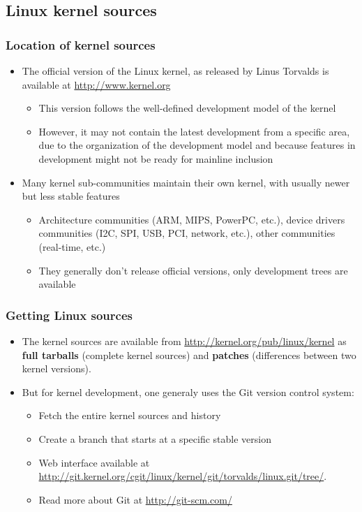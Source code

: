 \subsection{Linux kernel sources}

\begin{frame}
  \frametitle{Location of kernel sources}
  \begin{itemize}
  \item The official version of the Linux kernel, as released by Linus
    Torvalds is available at \url{http://www.kernel.org}
    \begin{itemize}
    \item This version follows the well-defined development model of
      the kernel
    \item However, it may not contain the latest development from a
      specific area, due to the organization of the development model
      and because features in development might not be ready for
      mainline inclusion
    \end{itemize}
  \item Many kernel sub-communities maintain their own kernel, with
    usually newer but less stable features
    \begin{itemize}
    \item Architecture communities (ARM, MIPS, PowerPC, etc.), device
      drivers communities (I2C, SPI, USB, PCI, network, etc.), other
      communities (real-time, etc.)
    \item They generally don't release official versions, only
      development trees are available
    \end{itemize}
  \end{itemize}
\end{frame}

\begin{frame}
  \frametitle{Getting Linux sources}
  \begin{itemize}

  \item The kernel sources are available from
    \url{http://kernel.org/pub/linux/kernel} as {\bf full tarballs}
    (complete kernel sources) and {\bf patches} (differences between
    two kernel versions).
  \item But for kernel development, one generaly uses the Git version
    control system:
    \begin{itemize}
    \item Fetch the entire kernel sources and history\\
    \item Create a branch that starts at a specific stable version\\
    \item Web interface available at
      \url{http://git.kernel.org/cgit/linux/kernel/git/torvalds/linux.git/tree/}.
    \item Read more about Git at \url{http://git-scm.com/}
    \end{itemize}
  \end{itemize}
\end{frame}

